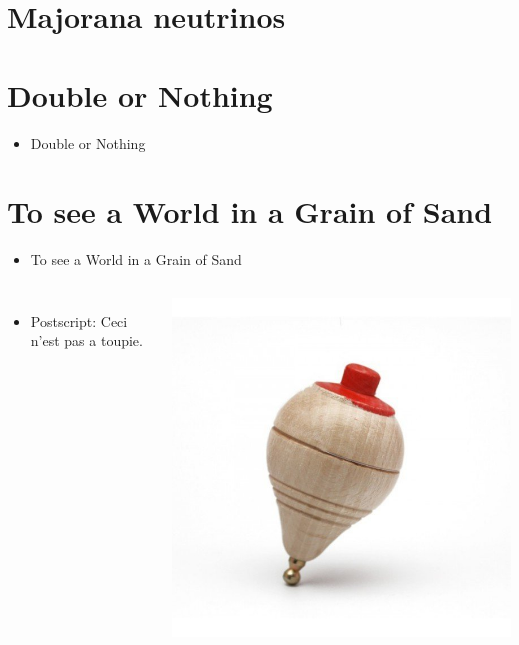 \documentclass[9pt]{beamer}
\begin{document}
\section{Majorana neutrinos}





\section{Double or Nothing}

\begin{frame}
\begin{itemize}
\item Double or Nothing
\end{itemize}
\end{frame}


\section{To see a World in a Grain of Sand }

\begin{frame}
\begin{itemize}
\item To see a World in a Grain of Sand
\end{itemize}
\end{frame}


\begin{frame}
\begin{columns}
\begin{itemize}
\item Postscript: Ceci n'est pas a toupie. 
\end{itemize}
\includegraphics[scale=0.20]{img/peonza.jpg}
\end{columns}
\end{frame}


\end{document}
